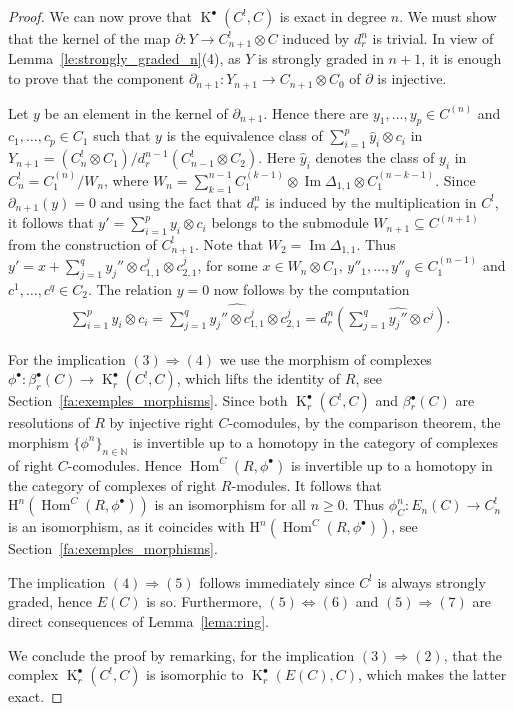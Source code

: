 \documentclass[pdftex]{sigma}
\newcommand{\h}{\mathrm{H}}
\DeclareMathOperator{\im}{Im}
\DeclareMathOperator{\K}{K}
\newcommand\ot{\otimes}
\newcommand\rar{\rightarrow}
\renewcommand{\^}[1]{\mbox{$^{\left( #1 \right)}$}}
\renewcommand{\_}[1]{\mbox{$_{\left( #1 \right)}$}}
\newcommand{\N}{{\mathbb N}}
\newcommand\Hom{\operatorname{Hom}}
\newcommand{\pa}{\partial}
\numberwithin{equation}{section}
\begin{document}
\begin{proof}
We can now prove that $\K^\bullet(C^!,C)$ is exact in degree $n$. We must show that the kernel of the map $\pa\colon Y\to C^!_{n+1}\ot C$ induced by $d^n_r$ is trivial. In view of Lemma~\ref{le:strongly_graded_n}(4), as $Y$ is strongly graded in $n+1$, it is enough to prove that the component $\pa_{n+1}\colon Y_{n+1}\to C_{n+1}\ot C_0$ of $\pa$ is injective.

Let $y$ be an element in the kernel of $\pa_{n+1}$. Hence there are ${y}_1, \dots,{y}_p\in C^{(n)}$ and $c_1,\dots, c_p\in C_1$ such that $y$ is the equivalence class of $\sum\limits_{i=1}^p \widehat{y}_i\ot c_i$ in $Y_{n+1}=(C_n^!\ot C_1)/d_r^{n-1}(C_{n-1}^!\ot C_2)$. Here $\widehat{y}_i$ denotes the class of $y_i$ in $C^!_n=C_1^{(n)}/W_n$, where $W_n=\sum\limits_{k=1}^{n-1} C_1^{(k-1)}\ot\im\Delta_{1,1}\ot C_1^{(n-k-1)}$. Since $\pa_{n+1}(y)=0$ and using the fact that $d_r^n$ is induced by the multiplication in $C^!$, it follows that $y'=\sum\limits_{i=1}^p {y}_i\ot c_i$ belongs to the submodule $W_{n+1}\subseteq C^{(n+1)}$ from the construction of $C_{n+1}^!$. Note that $W_2=\im\Delta_{1,1}$. Thus $y'=x+\sum\limits_{j=1}^q y_j''\ot c^j_{1,1}\ot c^j_{2,1}$, for some $x\in W_n\ot C_1$, $y''_1,\dots,y''_q\in C_1^{(n-1)}$ and $c^1,\dots,c^q\in C_2$. The relation $y=0$ now follows by the computation
\begin{gather*}
 \sum_{i=1}^p \widehat{y}_i\ot c_i=\sum_{j=1}^q \widehat{y_j''\ot c^j_{1,1}}\ot c^j_{2,1}=d_r^{n}\left(\sum_{j=1}^q {\widehat{y_j''}\ot c^j}\right).
\end{gather*}

For the implication $(3) \Longrightarrow (4)$ we use the morphism of complexes $\phi^\bullet\colon \beta^\bullet_r(C) \rar \operatorname{K}_r^\bullet(C^!,C)$, which lifts the identity of $R$, see Section~\ref{fa:exemples_morphisms}. Since both $\K^{\bullet}_{r}(C^!,C)$ and $\beta{}^{\bullet}_{r}(C)$ are resolutions of $R$ by injective right $C$-comodules, by the comparison theorem, the morphism $\{\phi^n\}_{n\in\N}$ is invertible up to a homotopy in the category of complexes of right $C$-comodules. Hence $\Hom^C(R,\phi^\bullet)$ is invertible up to a homotopy in the category of complexes of right $R$-modules. It follows that $\h^n(\Hom^C(R,\phi^\bullet))$ is an isomorphism for all $n\geq 0$. Thus $\phi^n_C\colon E_n(C)\to C^!_n$ is an isomorphism, as it coincides with $\h^n(\Hom^C(R,\phi^\bullet))$, see Section~\ref{fa:exemples_morphisms}.

The implication $(4) \Longrightarrow (5)$ follows immediately since $C^!$ is always strongly graded, hence $E(C)$ is so. Furthermore, $(5) \iff (6)$ and $(5) \Longrightarrow (7)$ are direct consequences of Lemma~\ref{lema:ring}.

We conclude the proof by remarking, for the implication $(3) \Longrightarrow (2)$, that the complex $\K^\bullet_r(C^!,C)$ is isomorphic to $\K^\bullet_r(E(C),C)$, which makes the latter exact.
\end{proof}
\end{document}
